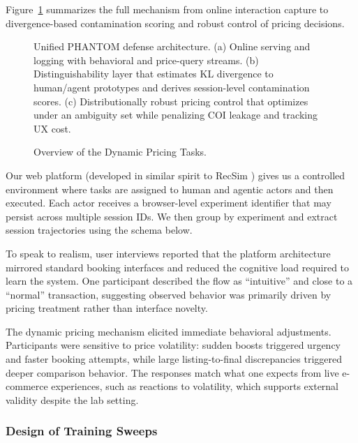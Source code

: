 Figure~\ref{fig:phantom_unified_architecture} summarizes the full mechanism from online interaction capture to divergence-based contamination scoring and robust control of pricing decisions.

\begin{figure}[ht]
  \centering
  \resizebox{\textwidth}{!}{%
    
  }
  \caption{Unified PHANTOM defense architecture. (a) Online serving and logging with behavioral and price-query streams. (b) Distinguishability layer that estimates KL divergence to human/agent prototypes and derives session-level contamination scores. (c) Distributionally robust pricing control that optimizes under an ambiguity set while penalizing COI leakage and tracking UX cost.}
  \label{fig:phantom_unified_architecture}
\end{figure}

\begin{figure}[ht]
  \resizebox{\columnwidth}{!}{%
    
  }
  \caption{Overview of the Dynamic Pricing Tasks.}
\end{figure}

Our web platform (developed in similar spirit to RecSim \parencite{ie_recsim_2019}) gives us a controlled environment where tasks are assigned to human and agentic actors and then executed. Each actor receives a browser-level experiment identifier that may persist across multiple session IDs. We then group by experiment and extract session trajectories using the schema below.

To speak to realism, user interviews reported that the platform architecture mirrored standard booking interfaces and reduced the cognitive load required to learn the system. One participant described the flow as ``intuitive'' and close to a ``normal'' transaction, suggesting observed behavior was primarily driven by pricing treatment rather than interface novelty.

The dynamic pricing mechanism elicited immediate behavioral adjustments. Participants were sensitive to price volatility: sudden boosts triggered urgency and faster booking attempts, while large listing-to-final discrepancies triggered deeper comparison behavior. The responses match what one expects from live e-commerce experiences, such as reactions to volatility, which supports external validity despite the lab setting.


\subsubsection{Design of Training Sweeps}

